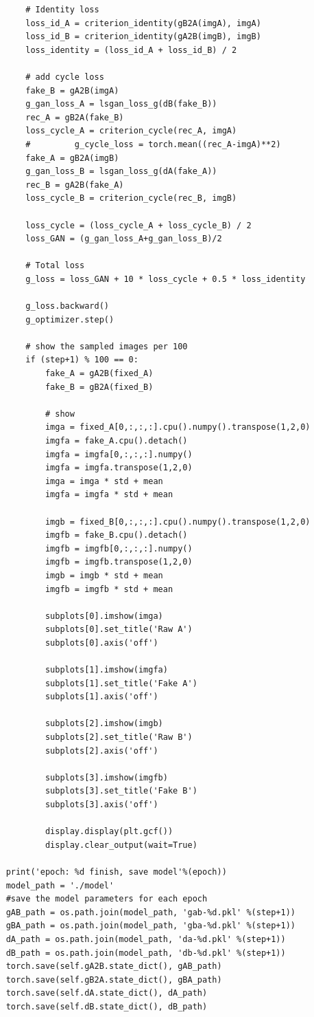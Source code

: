 \documentclass[runningheads]{llncs}
\begin{document}
\begin{subappendices}
\begin{lstlisting}
		# Identity loss
		loss_id_A = criterion_identity(gB2A(imgA), imgA)
		loss_id_B = criterion_identity(gA2B(imgB), imgB)
		loss_identity = (loss_id_A + loss_id_B) / 2
		
		# add cycle loss
		fake_B = gA2B(imgA)
		g_gan_loss_A = lsgan_loss_g(dB(fake_B))
		rec_A = gB2A(fake_B)
		loss_cycle_A = criterion_cycle(rec_A, imgA)
		#         g_cycle_loss = torch.mean((rec_A-imgA)**2)
		fake_A = gB2A(imgB)
		g_gan_loss_B = lsgan_loss_g(dA(fake_A))
		rec_B = gA2B(fake_A)
		loss_cycle_B = criterion_cycle(rec_B, imgB)
		
		loss_cycle = (loss_cycle_A + loss_cycle_B) / 2
		loss_GAN = (g_gan_loss_A+g_gan_loss_B)/2
		
		# Total loss
		g_loss = loss_GAN + 10 * loss_cycle + 0.5 * loss_identity
		
		g_loss.backward()
		g_optimizer.step()
		
		# show the sampled images per 100 
		if (step+1) % 100 == 0:
			fake_A = gA2B(fixed_A)
			fake_B = gB2A(fixed_B)
			
			# show
			imga = fixed_A[0,:,:,:].cpu().numpy().transpose(1,2,0)
			imgfa = fake_A.cpu().detach()
			imgfa = imgfa[0,:,:,:].numpy()
			imgfa = imgfa.transpose(1,2,0)
			imga = imga * std + mean
			imgfa = imgfa * std + mean
			
			imgb = fixed_B[0,:,:,:].cpu().numpy().transpose(1,2,0)
			imgfb = fake_B.cpu().detach()
			imgfb = imgfb[0,:,:,:].numpy()
			imgfb = imgfb.transpose(1,2,0)
			imgb = imgb * std + mean
			imgfb = imgfb * std + mean
			
			subplots[0].imshow(imga)
			subplots[0].set_title('Raw A')
			subplots[0].axis('off')
			
			subplots[1].imshow(imgfa)
			subplots[1].set_title('Fake A')
			subplots[1].axis('off')   
			
			subplots[2].imshow(imgb)
			subplots[2].set_title('Raw B')
			subplots[2].axis('off')
			
			subplots[3].imshow(imgfb)
			subplots[3].set_title('Fake B')
			subplots[3].axis('off')
			
			display.display(plt.gcf())
			display.clear_output(wait=True)
	
	print('epoch: %d finish, save model'%(epoch))
	model_path = './model'
	#save the model parameters for each epoch
	gAB_path = os.path.join(model_path, 'gab-%d.pkl' %(step+1))
	gBA_path = os.path.join(model_path, 'gba-%d.pkl' %(step+1))
	dA_path = os.path.join(model_path, 'da-%d.pkl' %(step+1))
	dB_path = os.path.join(model_path, 'db-%d.pkl' %(step+1))
	torch.save(self.gA2B.state_dict(), gAB_path)
	torch.save(self.gB2A.state_dict(), gBA_path)
	torch.save(self.dA.state_dict(), dA_path)
	torch.save(self.dB.state_dict(), dB_path)
\end{lstlisting}

\end{subappendices}
\end{document}
